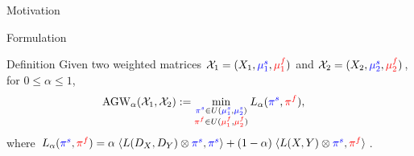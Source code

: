 \documentclass{beamer}
\newcommand{\agw}{\text{AGW}}
\newcommand{\cX}{\mathcal X}
\newcommand{\pis}{{\color{blue}{\pi^s}}}
\newcommand{\pif}{{\color{red}{\pi^f}}}
\newcommand{\mfsrc}{{\color{red}{\mu_1^f}}}
\newcommand{\mftg}{{\color{red}{\mu_2^f}}}
\newcommand{\mssrc}{{\color{blue}{\mu_1^s}}}
\newcommand{\mstg}{{\color{blue}{\mu_2^s}}}
\begin{document}
\begin{frame}{Motivation}
\end{frame}

\begin{frame}{Formulation}
\scriptsize
\begin{block}{Definition}
  Given two weighted matrices $\cX_1 = (X_1, \mssrc, \mfsrc)$
  and $\cX_2 = (X_2, \mstg, \mftg)$, for $0\leq \alpha \leq 1$,
  \begin{align*}
    \label{eq:scootr}
    \agw_{\alpha}(\cX_1, \cX_2) &:=
    \min_{\substack{\pis \in U(\mssrc,\mstg) \\ \pif \in U(\mfsrc,\mftg)}}
    L_{\alpha}(\pis, \pif),
  \end{align*}
  where $L_{\alpha}(\pis, \pif) =
  \alpha \; \langle L(D_X,D_Y)\otimes \pis, \pis \rangle
  + (1-\alpha) \; \langle L(X,Y) \otimes \pis, \pif \rangle$.
\end{block}



\end{frame}
\end{document}
